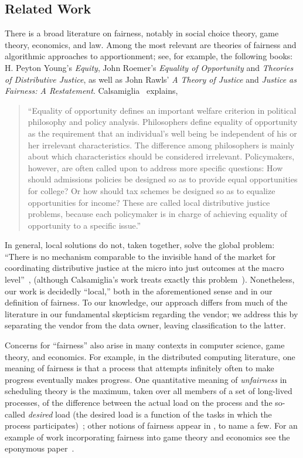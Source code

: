 \documentclass[letterpaper,11pt]{article}
\theoremstyle{definition}
\newcommand{\vendor}{vendor}
\newcommand{\network}{data owner}
\begin{document}
\subsection{Related Work}
There is a broad literature on fairness, notably in social choice theory,
game theory, economics, and law.
Among the most relevant are theories of fairness and algorithmic
approaches to apportionment; see, for example, the following books: 
H. Peyton Young's {\em Equity}, John Roemer's {\em Equality of Opportunity}
and {\em Theories of Distributive Justice}, as well as John Rawls' 
{\em A Theory of Justice} and {\em Justice as Fairness: A Restatement}.
Calsamiglia~\cite{Calsamiglia05} explains, 
\begin{quote}
``Equality of opportunity defines an important welfare
criterion in political philosophy and policy analysis.  Philosophers define
equality of opportunity as the requirement that an individual's well being be
independent of his or her irrelevant characteristics.  The difference
among philosophers is mainly about which characteristics should be
considered irrelevant.  Policymakers, however, are often called upon to 
address more specific questions: How should admissions policies be designed 
so as to provide equal opportunities for college? Or how should tax
schemes be designed so as to equalize opportunities for income?  
These are called local distributive justice problems, because each 
policymaker is in charge of achieving equality of opportunity to a 
specific issue.''
\end{quote}
In general, local solutions do not, taken together, solve the global problem:
``There is no mechanism comparable to the invisible hand of the market for
coordinating distributive justice at the micro into just outcomes at the macro
level''~\cite{Young95}, (although Calsamiglia's work treats exactly this
problem~\cite{Calsamiglia05}).  Nonetheless, our work is decidedly ``local,''
both in the aforementioned sense and in our definition of fairness.  To our
knowledge, our approach differs from much of the literature in our fundamental
skepticism regarding the \vendor ; we address this by separating the \vendor{}
from the \network , leaving classification to the latter.

Concerns for ``fairness'' also arise in many contexts in computer science,
game theory, and economics.  For example, in the distributed computing
literature, one meaning of fairness is that a process that attempts infinitely
often to make progress eventually makes progress. One quantitative meaning of
{\em unfairness} in scheduling theory is the maximum, taken over all members
of a set of long-lived processes, of the difference between the actual load on
the process and the so-called {\em desired} load (the desired load is a
function of the tasks in which the process participates)~\cite{AjtaiANRSW98};
other notions of fairness appear in \cite{BansalS06,Feige08,FeigeT11}, to name
a few.  For an example of work incorporating fairness into game theory and
economics see the eponymous paper~\cite{Rabin93}.
\end{document}
